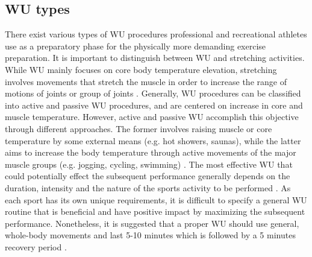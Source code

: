 \subsection{WU types}
There exist various types of WU procedures professional and recreational athletes use as a preparatory phase for the physically more demanding exercise preparation. It is important to distinguish between WU and stretching activities. While WU mainly focuses on core body temperature elevation, stretching involves movements that stretch the muscle in order to increase the range of motions of joints or group of joints \cite{knudson2008warm}. 
Generally, WU procedures can be classified into active and passive WU procedures, and are centered on increase in core and muscle temperature. However, active and passive WU accomplish this objective through different approaches. The former involves raising muscle or core temperature by some external means (e.g. hot showers, saunas), while the latter aims to increase the body temperature through active movements of the major muscle groups (e.g. jogging, cycling, swimming) \cite{shellock1985warming, bishop2003warm2}. The most effective WU that could potentially effect the subsequent performance generally depends on the duration, intensity and the nature of the sports activity to be performed \cite{bishop2003warm2}. As each sport has its own unique requirements, it is difficult to specify a general WU routine that is beneficial and have positive impact by maximizing the subsequent performance. Nonetheless, it is suggested that a proper WU should use general, whole-body movements and last 5-10 minutes which is followed by a 5 minutes recovery period \cite{bishop2003warm2}.  
